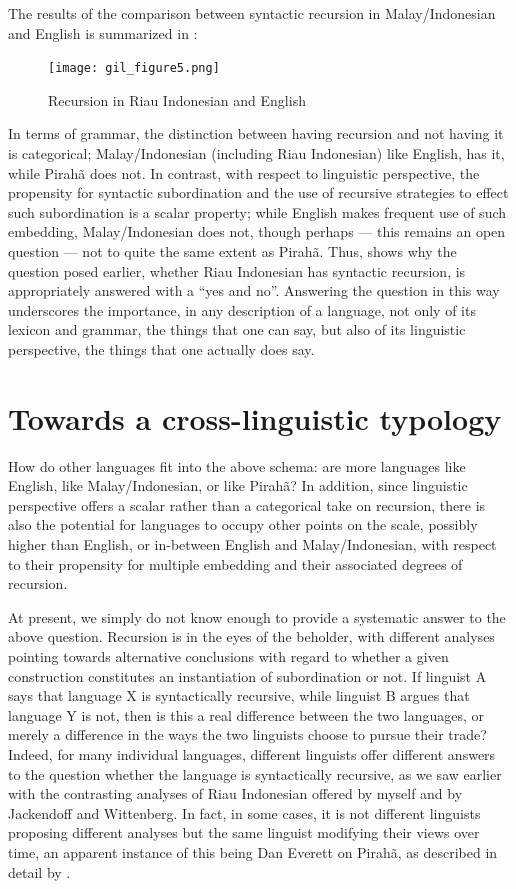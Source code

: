 \documentclass[output=paper,colorlinks,citecolor=brown
]{langscibook}
\begin{document}
The results of the comparison between syntactic recursion in Malay/Indonesian and English is summarized in :

\begin{figure}
\centering
\texttt{[image: gil\_figure5.png]}
\caption{\label{fig:gil:fig5}Recursion in Riau Indonesian and English}
\end{figure}

In terms of grammar, the distinction between having recursion and not having it is categorical; Malay/Indonesian (including Riau Indonesian) like English, has it, while Pirahã does not.  In contrast, with respect to linguistic perspective, the propensity for syntactic subordination and the use of recursive strategies to effect such subordination is a scalar property; while English makes frequent use of such embedding, Malay/Indonesian does not, though perhaps — this remains an open question — not to quite the same extent as Pirahã.  Thus,  shows why the question posed earlier, whether Riau Indonesian has syntactic recursion, is appropriately answered with a ``yes and no''.  Answering the question in this way underscores the importance, in any description of a language, not only of its lexicon and grammar, the things that one can say, but also of its linguistic perspective, the things that one actually does say.

\section{Towards a cross-linguistic typology}

How do other languages fit into the above schema: are more languages like English, like Malay/Indonesian, or like Pirahã?  In addition, since linguistic perspective offers a scalar rather than a categorical take on recursion, there is also the potential for languages to occupy other points on the scale, possibly higher than English, or in-between English and Malay/Indonesian, with respect to their propensity for multiple embedding and their associated degrees of recursion.

At present, we simply do not know enough to provide a systematic answer to the above question.  Recursion is in the eyes of the beholder, with different analyses pointing towards alternative conclusions with regard to whether a given construction constitutes an instantiation of subordination or not.  If linguist A says that language X is syntactically recursive, while linguist B argues that language Y is not, then is this a real difference between the two languages, or merely a difference in the ways the two linguists choose to pursue their trade?  Indeed, for many individual languages, different linguists offer different answers to the question whether the language is syntactically recursive, as we saw earlier with the contrasting analyses of Riau Indonesian offered by myself and by Jackendoff and Wittenberg. In fact, in some cases, it is not different linguists proposing different analyses but the same linguist modifying their views over time, an apparent instance of this being Dan Everett on Pirahã, as described in detail by .
\end{document}
